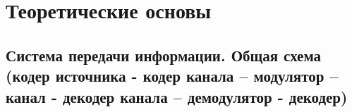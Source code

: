 


\newenvironment{Proof} 	%
	{\par\noindent{\bf Доказательство.}}  %
	{\hfill$\scriptstyle\blacksquare$}

\section{Теоретические основы}
\label{sec:theoretical}
\subsection{Система передачи информации. Общая схема (кодер источника - кодер канала – модулятор – канал - декодер канала – демодулятор - декодер)} %
